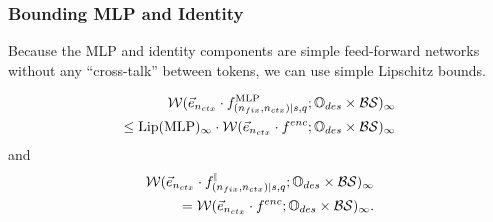\subsubsection{Bounding MLP and Identity}
Because the MLP and identity components are simple feed-forward networks without any ``cross-talk'' between tokens, we can use simple Lipschitz bounds.

\begin{lemma}
	\label{lem:mlpbound}
	\begin{align*}
		\mathcal{W}(\vec{e}_{n_{ctx}} \cdot f^{\text{MLP}}_{(n_{fix}, {n_{ctx}}) \mid {s}, q} ; \mathbb{O}_{des} \times \mathcal{B} \mathcal{S})_\infty 
		\\ \leq
		\mathrm{Lip}({\text{MLP}})_\infty \cdot \mathcal{W}(\vec{e}_{n_{ctx}} \cdot  f^{enc}; \mathbb{O}_{des} \times \mathcal{B} \mathcal{S})_\infty
	\end{align*}
	and
	\begin{align*}
		\mathcal{W}(\vec{e}_{n_{ctx}} \cdot f^{\mathbb{I}}_{(n_{fix}, {n_{ctx}}) \mid {s}, q}  ; \mathbb{O}_{des} \times \mathcal{B} \mathcal{S})_\infty \\ = \mathcal{W}(\vec{e}_{n_{ctx}} \cdot f^{enc}; \mathbb{O}_{des} \times \mathcal{B} \mathcal{S})_\infty.
	\end{align*}
\end{lemma}

